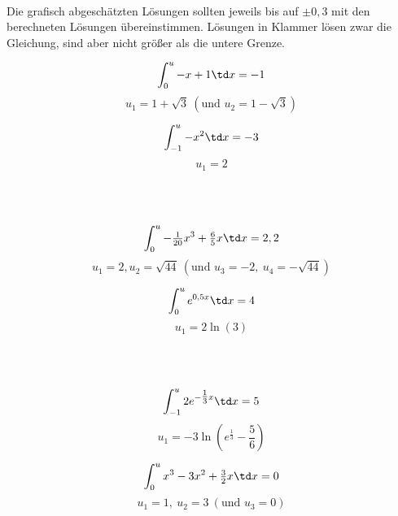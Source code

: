 \begin{Answer}[ref=intGrenzeA1]\\
	Die grafisch abgeschätzten Lösungen sollten jeweils bis auf \(\pm0,3\) mit den berechneten Lösungen übereinstimmen. Lösungen in Klammer lösen zwar die Gleichung, sind aber nicht größer als die untere Grenze.\\
	\begin{minipage}{\textwidth}
		\begin{minipage}{.5\textwidth}\raggedright
			\[\int_0^u-x+1 \td x=-1\]
			\[u_1=1+\sqrt{3}\ \left(\text{und }u_2=1-\sqrt{3}\right)\] 
		\end{minipage}
		\begin{minipage}{.5\textwidth}
			\[\int_{-1}^u-x^2 \td x=-3\]
			\[u_1=2\]
		\end{minipage}\vspace{\baselineskip}\\\vspace{\baselineskip}\\
		\begin{minipage}{.5\textwidth}\raggedright
			\[\int_0^u-\tfrac{1}{20}x^3+\tfrac{6}{5}x \td x=2,2\]
			\[u_1=2, u_2=\sqrt{44}\ \left(\text{und }u_3=-2,\ u_4=-\sqrt{44}\right)\]
		\end{minipage}
		\begin{minipage}{.5\textwidth}
			\[\int_0^u e^{0,5x} \td x=4\]
			\[u_1=2\ln(3)\]
		\end{minipage}\vspace{\baselineskip}\\\vspace{\baselineskip}\\
		\begin{minipage}{.5\textwidth}\raggedright
			\[\int_{-1}^u 2e^{-\tfrac{1}{3}x} \td x=5\]
			\[u_1=-3\ln\left(e^{\tfrac{1}{3}}-\frac{5}{6}\right)\]
		\end{minipage}
		\begin{minipage}{.5\textwidth}
			\[\int_0^u x^3-3x^2+\tfrac{3}{2}x \td x=0\]
			\[u_1=1,\ u_2=3\ \left(\text{und }u_3=0\right)\] 
		\end{minipage}
	\end{minipage}
\end{Answer}